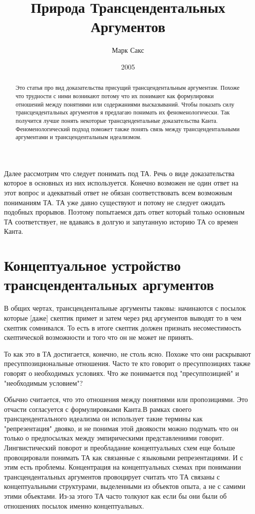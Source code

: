 \documentclass{article}
\title{Природа Трансцендентальных Аргументов}
\author{Марк Сакс}
\date{2005}
\begin{document}
\maketitle

\begin{abstract}
Это статья про вид доказательства присущий трансцендентальным аргументам. Похоже что трудности с ними возникают потому что их понимают как формулировки отношений между понятиями или содержаниями высказываний. Чтобы показать силу трансцендентальных аргументов я предлагаю понимать их феноменологически. Так получится лучше понять некоторые трансцендентальные доказательства Канта. Феноменологический подход поможет также понять связь между трансцендентальными аргументами и трансцендентальным идеализмом.
\end{abstract}

Далее рассмотрим что следует понимать под ТА. Речь о виде доказательства которое в основных из них используется. Конечно возможен не один ответ на этот вопрос и адекватный ответ не обязан соответствовать всем возможным пониманиям ТА. ТА уже давно существуют и потому не следует ожидать подобных прорывов. Поэтому попытаемся дать ответ который только основным ТА соответствует, не вдаваясь в долгую и запутанную историю ТА со времен Канта.

\section{Концептуальное устройство трансцендентальных аргументов}

В общих чертах, трансцендентальные аргументы таковы: начинаются с посылок которые [даже] скептик примет и затем через ряд аргументов выводят то в чем скептик сомнивался. То есть в итоге скептик должен признать несоместимость скептической возможности и того что он не может не принять.

То как это в ТА достигается, конечно, не столь ясно. Похоже что они раскрывают пресуппозициональные отношения. Часто те кто говорит о пресуппозициях также говорят о необходимых условиях. Что же понимается под "пресуппозицией" и "необходимым условием"?

Обычно считается, что это отношения между понятиями или пропозициями. Это отчасти согласуется с формулировками Канта.В рамках своего трансцендентального идеализма он использует такие термины как "репрезентация" двояко, и не понимая этой двоякости можно подумать что он только о предпосылках между эмпирическими представлениями говорит. Лингвистический поворот и преобладание концептуальных схем еще больше провоцировали понимать ТА как связанные с языковыми репрезентациями. И с этим есть проблемы. Концентрация на концептуальных схемах при понимании трансцендентальных аргументов провоцирует считать что ТА связаны с концептуальными структурами, выделенными из объектов опыта, а не с самими этими объектами. Из-за этого ТА часто толкуют как если бы они были об отношениях посылок именно концептуальных.
\end{document}
